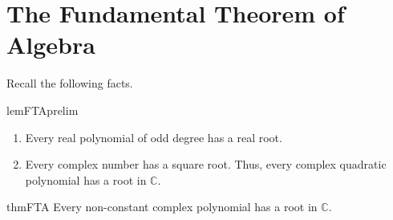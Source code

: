 \section{The Fundamental Theorem of Algebra}

Recall the following facts.

\begin{restatable}[]{lem}{FTAprelim}
\label{lem:FTAprelim}
    \phantom{hi}
    \begin{enumerate}
        \item Every real polynomial of odd degree has a real root.
        \item Every complex number has a square root. Thus, every complex quadratic polynomial has a root in $\mathbb{C}.$ \hfill\hyperref[lem:FTAprelim2]{\downsym}
    \end{enumerate} 
\end{restatable}

\begin{restatable}{thm}{FTA}
\label{thm:FTA}
    Every non-constant complex polynomial has a root in $\mathbb{C}.$ \hfill\hyperref[thm:FTA2]{\downsym}
\end{restatable}
